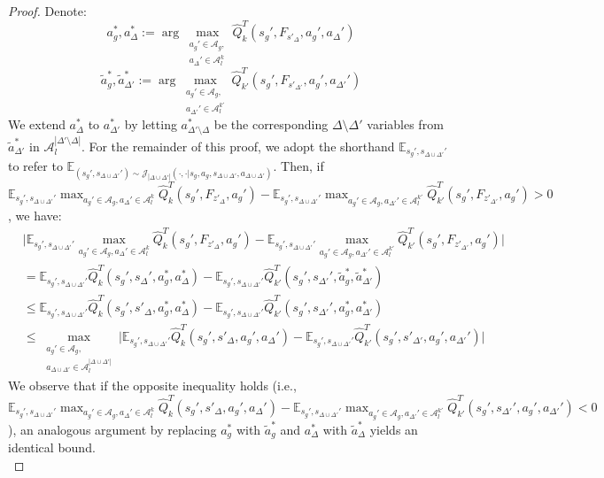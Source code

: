 \documentclass{article}
\theoremstyle{plain}
\theoremstyle{definition}
\def\E{\mathbb{E}}
\begin{document}
\begin{proof} Denote:
\[a_g^*,a_\Delta^* := \arg\max_{\substack{a_g'\in\mathcal{A}_g,\\ a_{\Delta}'\in\mathcal{A}_l^k}}\hat{Q}_k^T(s_g', F_{s'_\Delta}, a_g',a_\Delta')\]\[\tilde{a}_g^*,\tilde{a}_{\Delta'}^* := \arg\max_{\substack{a_g'\in\mathcal{A}_g,\\ a_{\Delta'}'\in\mathcal{A}_l^{k'}}}\hat{Q}_{k'}^T(s_g', F_{s'_{\Delta'}}, a_g',a_{\Delta'}')\]
We extend $a_\Delta^*$ to $a_{\Delta'}^*$ by letting $a_{\Delta'\setminus\Delta}^*$ be the corresponding $\Delta\setminus\Delta'$ variables from $\tilde{a}_{\Delta'}^*$ in $\mathcal{A}_l^{|\Delta'\setminus\Delta|}$. For the remainder of this proof, we adopt the shorthand $\E_{s_g',s_{\Delta\cup\Delta'}'}$ to refer to $\E_{(s_g',s_{\Delta\cup\Delta'}')\sim \mathcal{J}_{|\Delta\cup\Delta'|}(\cdot,\cdot|s_g, a_g, s_{\Delta\cup\Delta'}, a_{\Delta\cup\Delta'})}$. Then, if $\E_{s_g',s_{\Delta\cup\Delta'}'} \max_{a_g'\in\mathcal{A}_g, a_\Delta'\in\mathcal{A}_l^k}\hat{Q}_k^T(s_g', F_{z'_\Delta}, a_g') - \E_{s_g',s_{\Delta\cup\Delta'}'}\max_{a_g'\in\mathcal{A}_g,a_{\Delta'}'\in\mathcal{A}_l^{k'}}\hat{Q}_{k'}^T(s_g', F_{z'_{\Delta'}}, a_g')>0$, we have:
\begin{align*}
&\bigg|\E_{s_g',s_{\Delta\cup\Delta'}'} \max_{a_g'\in\mathcal{A}_g,a_{\Delta}'\in\mathcal{A}_l^{k}}\hat{Q}_k^T(s_g', F_{z'_\Delta}, a_g') - \E_{s_g',s_{\Delta\cup\Delta'}'}\max_{a_g'\in\mathcal{A}_g,a_{\Delta'}'\in\mathcal{A}_l^{k'}}\hat{Q}_{k'}^T(s_g', F_{z'_{\Delta'}}, a_g')\bigg| \\
&= \E_{s_g',s_{\Delta\cup\Delta'}'} \hat{Q}_k^T(s_g', s_\Delta', a_g^*, a^*_\Delta) -\E_{s_g',s_{\Delta\cup\Delta'}'} \hat{Q}_{k'}^T(s_g',s_{\Delta'}', \tilde{a}_g^*,\tilde{a}^*_{\Delta'}) \\
&\leq \E_{s_g',s_{\Delta\cup\Delta'}'}\hat{Q}^T_k(s_g', s'_\Delta, a_g^*,a_\Delta^*) - \E_{s_g',s_{\Delta\cup\Delta'}'} \hat{Q}_{k'}^T(s_g', s_{\Delta'}', a_g^*,a_{\Delta'}^*) \\
&\leq \max_{\substack{a_g'\in\mathcal{A}_g,\\ a_{\Delta\cup\Delta'}\in\mathcal{A}_l^{|\Delta\cup\Delta'|}}}\bigg|\E_{s_g',s_{\Delta\cup\Delta'}'}\hat{Q}_k^T(s_g', s'_\Delta, a_g',a_{\Delta}') - \E_{s_g',s_{\Delta\cup\Delta'}'}\hat{Q}_{k'}^T(s_g', s'_{\Delta'}, a_g', a_{\Delta'}')\bigg|
\end{align*}
We observe that if the opposite inequality holds (i.e., $\E_{s_g',s_{\Delta\cup\Delta'}'} \max_{a_g'\in\mathcal{A}_g, a_\Delta'\in\mathcal{A}_l^k}\hat{Q}_k^T(s_g', s'_\Delta, a_g',a_\Delta') - \E_{s_g',s_{\Delta\cup\Delta'}'}\max_{a_g'\in\mathcal{A}_g, a_{\Delta'}'\in\mathcal{A}_l^{k'}}\hat{Q}_{k'}^T(s_g', s_{\Delta'}', a_g', a_{\Delta'}')<0$), an analogous argument by replacing $a_g^*$ with $\tilde{a}_g^*$ and $a_{\Delta}^*$ with $\tilde{a}_\Delta^*$ yields an identical bound. \qedhere \\
\end{proof}
\end{document}
